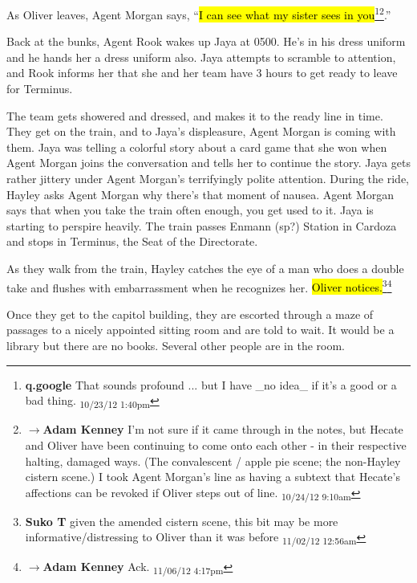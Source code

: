 As Oliver leaves, Agent Morgan says, ``\hl{I can see what my sister sees in you}\footnote{\textbf{q.google }That sounds profound ... but I have \_no idea\_ if it's a good or a bad thing. \textsubscript{10/23/12 1:40pm}}\footnote{$\rightarrow$\textbf{Adam Kenney }I'm not sure if it came through in the notes, but Hecate and Oliver have been continuing to come onto each other - in their respective halting, damaged ways.  (The convalescent / apple pie scene; the non-Hayley cistern scene.)  I took Agent Morgan's line as having a subtext that Hecate's affections can be revoked if Oliver steps out of line. \textsubscript{10/24/12 9:10am}}.''






Back at the bunks, Agent Rook wakes up Jaya at 0500. He's in his dress uniform and he hands her a dress uniform also.  Jaya attempts to scramble to attention, and Rook informs her that she and her team have 3 hours to get ready to leave for Terminus.



The team gets showered and dressed, and makes it to the ready line in time.  They get on the train, and to Jaya's displeasure, Agent Morgan is coming with them.  Jaya was telling a colorful story about a card game that she won when Agent Morgan joins the conversation and tells her to continue the story.  Jaya gets rather jittery under Agent Morgan's terrifyingly polite attention.  During the ride, Hayley asks Agent Morgan why there's that moment of nausea.  Agent Morgan says that when you take the train often enough, you get used to it.  Jaya is starting to perspire heavily.  The train passes Enmann (sp?) Station in Cardoza and stops in Terminus, the Seat of the Directorate.



As they walk from the train, Hayley catches the eye of a man who does a double take and flushes with embarrassment when he recognizes her.  \hl{Oliver notices.}\footnote{\textbf{Suko T }given the amended cistern scene, this bit may be more informative/distressing to Oliver than it was before \textsubscript{11/02/12 12:56am}}\footnote{$\rightarrow$\textbf{Adam Kenney }Ack. \textsubscript{11/06/12 4:17pm}}



Once they get to the capitol building, they are escorted through a maze of passages to a nicely appointed sitting room and are told to wait.  It would be a library but there are no books.  Several other people are in the room.   



